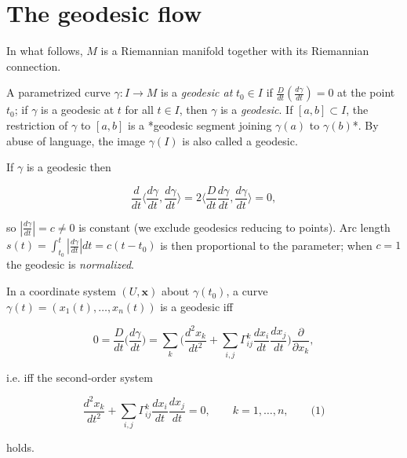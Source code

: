\section{The geodesic flow}

In what follows, $M$ is a Riemannian manifold together with its Riemannian
connection.

\begin{definition}[geodesic]
  \label{def:dc-ch3-2-1}
  \leanok
  A parametrized curve $\gamma:I\to M$ is a \emph{geodesic at} $t_0\in I$ if
  $\frac{D}{dt}\left(\frac{d\gamma}{dt}\right)=0$ at the point $t_0$; if $\gamma$ is
  a geodesic at $t$ for all $t\in I$, then $\gamma$ is a \emph{geodesic}. If
  $[a,b]\subset I$, the restriction of $\gamma$ to $[a,b]$ is a *geodesic segment
  joining $\gamma(a)$ to $\gamma(b)$*. By abuse of language, the image $\gamma(I)$
  is also called a geodesic.
  
  If $\gamma$ is a geodesic then
  
  $$
  \frac{d}{dt}\Big\langle\frac{d\gamma}{dt},\frac{d\gamma}{dt}\Big\rangle=2\Big\langle\frac{D}{dt}\frac{d\gamma}{dt},\frac{d\gamma}{dt}\Big\rangle=0,
  $$
  
  so $\left|\frac{d\gamma}{dt}\right|=c\neq 0$ is constant (we exclude geodesics
  reducing to points). Arc length $s(t)=\int_{t_0}^t\left|\frac{d\gamma}{dt}\right|dt=c(t-t_0)$
  is then proportional to the parameter; when $c=1$ the geodesic is \emph{normalized}.
  
  In a coordinate system $(U,\mathbf{x})$ about $\gamma(t_0)$, a curve
  $\gamma(t)=(x_1(t),\dots,x_n(t))$ is a geodesic iff
  
  $$
  0=\frac{D}{dt}\Big(\frac{d\gamma}{dt}\Big)=\sum_k\Big(\frac{d^2x_k}{dt^2}+\sum_{i,j}\Gamma_{ij}^k\frac{dx_i}{dt}\frac{dx_j}{dt}\Big)\frac{\partial}{\partial x_k},
  $$
  
  i.e. iff the second-order system
  
  $$
  \frac{d^2x_k}{dt^2}+\sum_{i,j}\Gamma_{ij}^k\frac{dx_i}{dt}\frac{dx_j}{dt}=0,\qquad k=1,\dots,n,\qquad\text{(1)}
  $$
  
  holds.
\end{definition}

